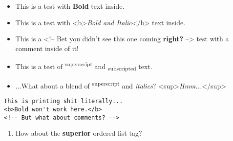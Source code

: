 \documentclass[12pt]{article}
\begin{document}
\begin{itemize}
	\item This is a test with \textbf{Bold} text inside.

	\item This is a test with <b>\textit{Bold and Italic}</b> text inside.

	\item This is a <!-- Bet you didn't see this one coming \textbf{right?} --> test with a comment inside of it!

	\item This is a test of \textsuperscript{superscript} and \textsubscript{subscripted} text.

	\item ...What about a blend of \textsuperscript{superscript} and \textit{italics}? <sup>\textit{Hmm...}</sup>

\end{itemize}
\begin{verbatim}This is printing shit literally...
<b>Bold won't work here.</b>
<!-- But what about comments? -->\end{verbatim}
\begin{enumerate}
	\item How about the \textbf{superior} ordered list tag?

\end{enumerate}
\end{document}

